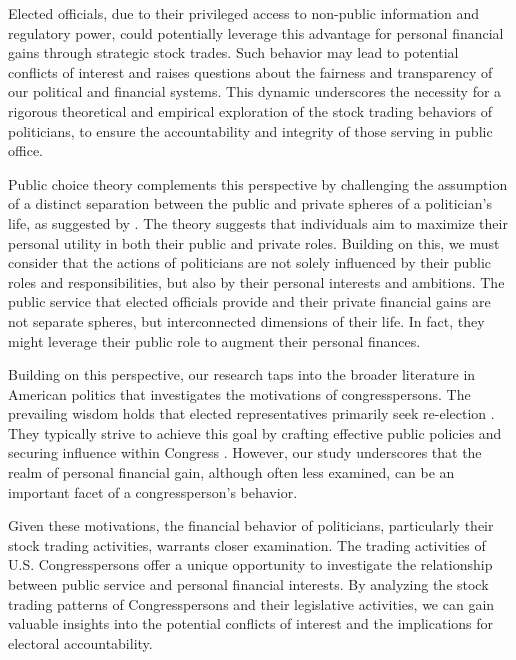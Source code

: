 \documentclass[15pt,letterpaper]{article}
\begin{document}
Elected officials, due to their privileged access to non-public information and regulatory power, could potentially leverage this advantage for personal financial gains through strategic stock trades. Such behavior may lead to potential conflicts of interest and raises questions about the fairness and transparency of our political and financial systems. This dynamic underscores the necessity for a rigorous theoretical and empirical exploration of the stock trading behaviors of politicians, to ensure the accountability and integrity of those serving in public office.

Public choice theory complements this perspective by challenging the assumption of a distinct separation between the public and private spheres of a politician's life, as suggested by \cite{buchanan1984}.
The theory suggests that individuals aim to maximize their personal utility in both their public and private roles.
Building on this, we must consider that the actions of politicians are not solely influenced by their public roles and responsibilities, but also by their personal interests and ambitions. The public service that elected officials provide and their private financial gains are not separate spheres, but interconnected dimensions of their life. In fact, they might leverage their public role to augment their personal finances.

Building on this perspective, our research taps into the broader literature in American politics that investigates the motivations of congresspersons. The prevailing wisdom holds that elected representatives primarily seek re-election \citep{mayhew1974congress}. They typically strive to achieve this goal by crafting effective public policies and securing influence within Congress \citep{fenno1977}. However, our study underscores that the realm of personal financial gain, although often less examined, can be an important facet of a congressperson's behavior.

Given these motivations, the financial behavior of politicians, particularly their stock trading activities, warrants closer examination. The trading activities of U.S. Congresspersons offer a unique opportunity to investigate the relationship between public service and personal financial interests. By analyzing the stock trading patterns of Congresspersons and their legislative activities, we can gain valuable insights into the potential conflicts of interest and the implications for electoral accountability.
\end{document}
